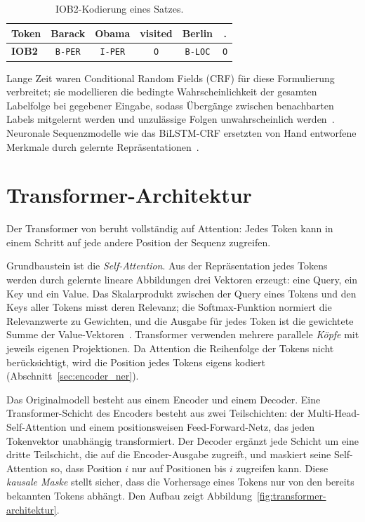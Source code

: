 \begin{table}[htbp]
  \centering
  \small
  \renewcommand{\arraystretch}{1.3}
  \caption[IOB2-Kodierung eines Satzes]{IOB2-Kodierung eines Satzes.}
  \label{tab:bio-beispiel}
  \begin{tabular}{lccccc}
    \toprule
    \textbf{Token} & Barack & Obama & visited & Berlin & . \\
    \midrule
    \textbf{IOB2} & \texttt{B-PER} & \texttt{I-PER}
                  & \texttt{O} & \texttt{B-LOC} & \texttt{O} \\
    
    \bottomrule
  \end{tabular}
\end{table}

Lange Zeit waren Conditional Random Fields (CRF) für diese
Formulierung verbreitet; sie modellieren die bedingte
Wahrscheinlichkeit der gesamten Labelfolge bei gegebener Eingabe, sodass
Übergänge zwischen benachbarten Labels mitgelernt werden und unzulässige
Folgen unwahrscheinlich werden~\cite{lafferty2001crf}.
Neuronale Sequenzmodelle wie das BiLSTM-CRF ersetzten von Hand
entworfene Merkmale durch gelernte
Repräsentationen~\cite{lample2016neural,ma2016end}.

\section{Transformer-Architektur}
\label{sec:transformer}

Der Transformer von \textcite{vaswani2017attention} beruht
vollständig auf Attention: Jedes Token kann in einem Schritt auf jede
andere Position der Sequenz zugreifen.

Grundbaustein ist die \emph{Self-Attention}.
Aus der Repräsentation jedes Tokens werden durch gelernte lineare
Abbildungen drei Vektoren erzeugt: eine Query, ein Key und ein Value.
Das Skalarprodukt zwischen der Query eines Tokens und den Keys aller
Tokens misst deren Relevanz; die Softmax-Funktion normiert die
Relevanzwerte zu Gewichten, und die Ausgabe für jedes Token ist die
gewichtete Summe der
Value-Vektoren~\cite{vaswani2017attention}.
Transformer verwenden mehrere parallele \emph{Köpfe} mit jeweils
eigenen Projektionen.
Da Attention die Reihenfolge der Tokens nicht berücksichtigt, wird die
Position jedes Tokens eigens kodiert
(Abschnitt~\ref{sec:encoder_ner}).

Das Originalmodell besteht aus einem Encoder und einem Decoder.
Eine Transformer-Schicht des Encoders besteht aus zwei Teilschichten: der
Multi-Head-Self-Attention und einem positionsweisen Feed-Forward-Netz,
das jeden Tokenvektor unabhängig transformiert.
Der Decoder ergänzt jede Schicht um eine dritte Teilschicht, die auf die
Encoder-Ausgabe zugreift, und maskiert seine Self-Attention so, dass
Position $i$ nur auf Positionen bis $i$ zugreifen kann.
Diese \emph{kausale Maske} stellt sicher, dass die Vorhersage eines
Tokens nur von den bereits bekannten Tokens abhängt.
Den Aufbau zeigt Abbildung~\ref{fig:transformer-architektur}.

